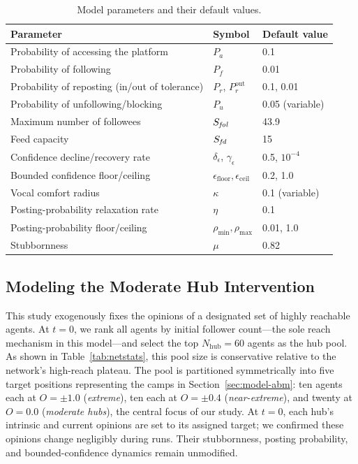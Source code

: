 \documentclass{svproc}
\def\Blue{\color[rgb]{0,0,1}}
\def\Black{\color[rgb]{0,0,0}}
\def\post{\rho}                 %
\def\BoundedConfidence{\epsilon} %
\def\Stubbornness{\mu}           %
\def\maxfollower{S_{\it fol}}    %
\def\maxfeed{S_{\it fd}}         %
\def\VCR{\kappa}                 %
\begin{document}
\begin{table}[t]\Blue
\centering
\caption{Model parameters and their default values.}\label{tab:param}
\tabcolsep=5pt
\begin{tabular}{lll}
\toprule
Parameter & Symbol & Default value \\
\midrule
Probability of accessing the platform & $P_a$ & 0.1 \\
Probability of following & $P_f$ & 0.01 \\
Probability of reposting (in/out of tolerance) & $P_r$, $P_r^{\text{out}}$ & 0.1, 0.01 \\
Probability of unfollowing/blocking & $P_u$ & 0.05 (variable) \\
Maximum number of followees & $\maxfollower$ & 43.9 \\
Feed capacity & $\maxfeed$ & 15 \\
Confidence decline/recovery rate & $\delta_{\BoundedConfidence}$, $\gamma_{\BoundedConfidence}$ & 0.5, $10^{-4}$ \\
Bounded confidence floor/ceiling & $\BoundedConfidence_{\mathrm{floor}},\BoundedConfidence_{\mathrm{ceil}}$ & 0.2, 1.0 \\
Vocal comfort radius & $\VCR$ & 0.1 (variable) \\
Posting-probability relaxation rate & $\eta$ & 0.1 \\
Posting-probability floor/ceiling & $\post_{\min},\post_{\max}$ & 0.01, 1.0 \\
Stubbornness & $\Stubbornness$ & 0.82 \\
\bottomrule
\end{tabular}\Black
\end{table}


\subsection{Modeling the Moderate Hub Intervention}\label{sec:model-intervention}
This study exogenously fixes the opinions of a designated set of
highly reachable agents. At $t=0$, we rank all agents by initial
follower count—the sole reach mechanism in this model—and select the
top $N_{\mathrm{hub}}=60$ agents as the hub pool. As shown in
Table~\ref{tab:netstats}, this pool size is conservative relative to
the network's high-reach plateau. The pool is partitioned
symmetrically into five target positions representing the camps in
Section~\ref{sec:model-abm}: ten agents each at $O=\pm1.0$
(\emph{extreme}), ten each at $O=\pm0.4$ (\emph{near-extreme}), and
twenty at $O=0.0$ (\emph{moderate hubs}), the central focus of our
study. At $t=0$, each hub's intrinsic and current opinions are set to
its assigned target; we confirmed these opinions change negligibly
during runs. Their stubbornness, posting probability, and
bounded-confidence dynamics remain unmodified.
\par
\end{document}
